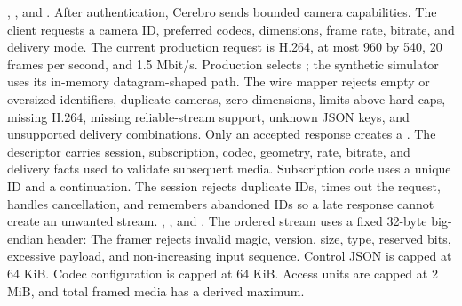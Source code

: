 {}\markdownRendererBlockQuoteBegin
{} , , and .\markdownRendererBlockQuoteEnd \markdownRendererInterblockSeparator
{}After authentication, Cerebro sends bounded camera capabilities. The client requests a camera ID, preferred codecs, dimensions, frame rate, bitrate, and delivery mode. The current production request is H.264, at most 960 by 540, 20 frames per second, and 1.5 Mbit/s. Production selects ; the synthetic simulator uses its in-memory datagram-shaped path.\markdownRendererParagraphSeparator
{}The wire mapper rejects empty or oversized identifiers, duplicate cameras, zero dimensions, limits above hard caps, missing H.264, missing reliable-stream support, unknown JSON keys, and unsupported delivery combinations.\markdownRendererParagraphSeparator
{}Only an accepted response creates a . The descriptor carries session, subscription, codec, geometry, rate, bitrate, and delivery facts used to validate subsequent media.\markdownRendererParagraphSeparator
{}Subscription code uses a unique ID and a continuation. The session rejects duplicate IDs, times out the request, handles cancellation, and remembers abandoned IDs so a late response cannot create an unwanted stream.\markdownRendererInterblockSeparator
{}
\markdownRendererSectionEnd \markdownRendererSectionBegin
{}\markdownRendererInterblockSeparator
{}\markdownRendererBlockQuoteBegin
{} , , and .\markdownRendererBlockQuoteEnd \markdownRendererInterblockSeparator
{}The ordered stream uses a fixed 32-byte big-endian  header:\markdownRendererInterblockSeparator
{}\markdownRendererInterblockSeparator
{}The framer rejects invalid magic, version, size, type, reserved bits, excessive payload, and non-increasing input sequence. Control JSON is capped at 64 KiB. Codec configuration is capped at 64 KiB. Access units are capped at 2 MiB, and total framed media has a derived maximum.\markdownRendererParagraphSeparator
